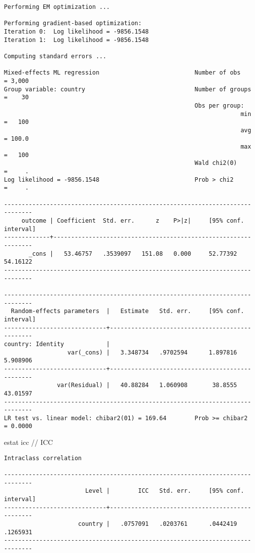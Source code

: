 \documentclass[
  letterpaper,
  DIV=11,
  numbers=noendperiod]{scrreprt}
\newenvironment{Shaded}{\begin{snugshade}}{\end{snugshade}}
\newcommand{\CommentTok}[1]{\textcolor[rgb]{0.37,0.37,0.37}{#1}}
\newcommand{\KeywordTok}[1]{\textcolor[rgb]{0.00,0.23,0.31}{#1}}
\newcommand{\NormalTok}[1]{\textcolor[rgb]{0.00,0.23,0.31}{#1}}
\begin{document}
\begin{verbatim}
Performing EM optimization ...

Performing gradient-based optimization: 
Iteration 0:  Log likelihood = -9856.1548  
Iteration 1:  Log likelihood = -9856.1548  

Computing standard errors ...

Mixed-effects ML regression                           Number of obs    = 3,000
Group variable: country                               Number of groups =    30
                                                      Obs per group:
                                                                   min =   100
                                                                   avg = 100.0
                                                                   max =   100
                                                      Wald chi2(0)     =     .
Log likelihood = -9856.1548                           Prob > chi2      =     .

------------------------------------------------------------------------------
     outcome | Coefficient  Std. err.      z    P>|z|     [95% conf. interval]
-------------+----------------------------------------------------------------
       _cons |   53.46757   .3539097   151.08   0.000     52.77392    54.16122
------------------------------------------------------------------------------

------------------------------------------------------------------------------
  Random-effects parameters  |   Estimate   Std. err.     [95% conf. interval]
-----------------------------+------------------------------------------------
country: Identity            |
                  var(_cons) |   3.348734   .9702594      1.897816    5.908906
-----------------------------+------------------------------------------------
               var(Residual) |   40.88284   1.060908       38.8555    43.01597
------------------------------------------------------------------------------
LR test vs. linear model: chibar2(01) = 169.64        Prob >= chibar2 = 0.0000
\end{verbatim}

\begin{Shaded}
\begin{Highlighting}[]
  
\KeywordTok{estat}\NormalTok{ icc }\CommentTok{// ICC}
\end{Highlighting}
\end{Shaded}

\begin{verbatim}
Intraclass correlation

------------------------------------------------------------------------------
                       Level |        ICC   Std. err.     [95% conf. interval]
-----------------------------+------------------------------------------------
                     country |   .0757091   .0203761      .0442419    .1265931
------------------------------------------------------------------------------
\end{verbatim}
\end{document}
